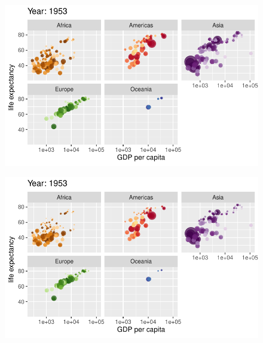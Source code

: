 \documentclass[
  letterpaper,
  DIV=11,
  numbers=noendperiod]{scrartcl}
\begin{document}
\begin{figure}[H]

{\centering \includegraphics{class05_files/figure-pdf/unnamed-chunk-24-2.pdf}

}

\end{figure}

\begin{figure}[H]

{\centering \includegraphics{class05_files/figure-pdf/unnamed-chunk-24-3.pdf}

}

\end{figure}
\end{document}
